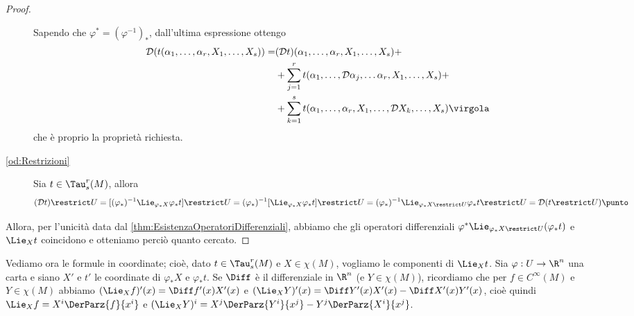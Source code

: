 \begin{proof}
\begin{description}
	Sapendo che $\varphi^*=(\varphi^{-1})_*$, dall'ultima espressione ottengo
	\begin{align*}
		\mathcal D(t(\alpha_1,\ldots,\alpha_r,X_1,\ldots,X_s)) =& (\mathcal D t)(\alpha_1,\ldots,\alpha_r,X_1,\ldots,X_s)+\\
		&+\sum_{j=1}^r{t(\alpha_1,\ldots,\mathcal D \alpha_j, \ldots \alpha_r,X_1,\ldots,X_s)} +\\
		&+\sum_{k=1}^s{t(\alpha_1,\ldots, \alpha_r,X_1,\ldots,\mathcal D X_k, \ldots,X_s)} \virgola
	\end{align*}
	che è proprio la proprietà richiesta.
	
	\item [\ref{od:Restrizioni}]
		Sia $t\in\Tau_s^r(M)$, allora
		\begin{equation*}
			(\mathcal Dt)\restrict U = [(\varphi_*)^{-1} \Lie_{\varphi_*X}\varphi_*t]\restrict U 
			= (\varphi_*)^{-1}[\Lie_{\varphi_*X}\varphi_*t]\restrict U 
			= (\varphi_*)^{-1} \Lie_{\varphi_*X\restrict U}\varphi_*t \restrict U = \mathcal D(t\restrict U) \punto
		\end{equation*}
	\end{description}
	
	Allora, per l'unicità data dal \cref{thm:EsistenzaOperatoriDifferenziali}, abbiamo che gli operatori differenziali $\varphi^*\Lie_{\varphi_*X\restrict U}(\varphi_*t)$ e $\Lie_Xt$ coincidono e otteniamo perciò quanto cercato.
\end{proof}

Vediamo ora le formule in coordinate; cioè, dato $t\in\Tau_s^r(M)$ e $X\in\chi(M)$, vogliamo le componenti di $\Lie_Xt$.
Sia $\varphi: U \to \R^n$ una carta e siano $X'$ e $t'$ le coordinate di $\varphi_*X$ e $\varphi_*t$.
Se $\Diff$ è il differenziale in $\R^n$ (e $Y\in\chi(M)$), ricordiamo che per $f\in C^\infty(M)$ e $Y\in \chi(M)$ abbiamo
$(\Lie_Xf)' (x) = \Diff f'(x) X'(x)$ e $(\Lie_XY)'(x) = \Diff Y'(x)X'(x) - \Diff X'(x)Y'(x)$, cioè quindi
$\Lie_X f = X^i \DerParz{f}{x^i}$ e $(\Lie_XY)^i = X^j\DerParz{Y^i}{x^j} - Y^j\DerParz{X^i}{x^j}$.

